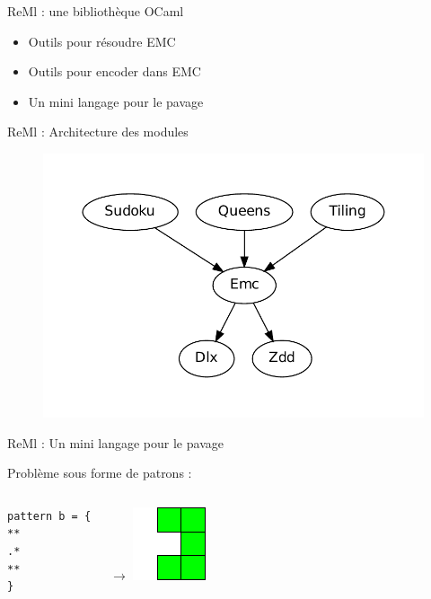\documentclass{beamer}
\begin{document}
\begin{frame}{ReMl : une bibliothèque OCaml}
\begin{itemize}
\item Outils pour résoudre EMC
\item Outils pour encoder dans EMC
\item Un mini langage pour le pavage
\end{itemize}
\end{frame}


\begin{frame}{ReMl : Architecture des modules}
\begin{figure}[htp]
\begin{center}
\includegraphics[scale=0.5]{../imports/archi_slide.pdf}
\end{center}
\end{figure}
\end{frame}

\begin{frame}[fragile]{ReMl : Un mini langage pour le pavage}

Problème sous forme de patrons : 
\begin{columns}
\begin{verbatim}
pattern b = {
**
.*
**
}
\end{verbatim}
		$\rightarrow$
\includegraphics[scale=1]{../imports/patron.pdf}
\end{columns}
\end{frame}
\end{document}
